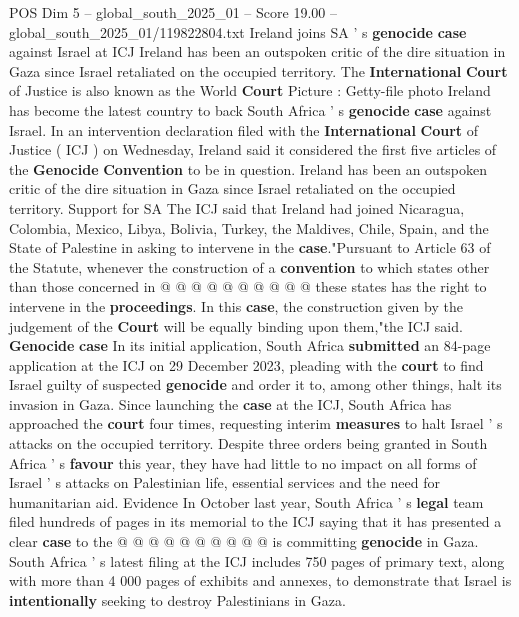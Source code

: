 \begin{textsample}{POS Dim 5 – global\_south\_2025\_01 – Score 19.00 – global\_south\_2025\_01/119822804.txt}  \label{ex:f5_pos_351}
Ireland joins SA ' s \textbf{genocide} \textbf{case} against Israel at ICJ Ireland has been an outspoken critic of the dire situation in Gaza since Israel retaliated on the occupied territory.
The \textbf{International} \textbf{Court} of Justice is also known as the World \textbf{Court} Picture : Getty-file photo Ireland has become the latest country to back South Africa ' s \textbf{genocide} \textbf{case} against Israel.
In an intervention declaration filed with the \textbf{International} \textbf{Court} of Justice ( ICJ ) on Wednesday, Ireland said it considered the first five articles of the \textbf{Genocide} \textbf{Convention} to be in question.
Ireland has been an outspoken critic of the dire situation in Gaza since Israel retaliated on the occupied territory.
Support for SA The ICJ said that Ireland had joined Nicaragua, Colombia, Mexico, Libya, Bolivia, Turkey, the Maldives, Chile, Spain, and the State of Palestine in asking to intervene in the \textbf{case}."Pursuant to Article 63 of the Statute, whenever the construction of a \textbf{convention} to which states other than those concerned in @ @ @ @ @ @ @ @ @ @ these states has the right to intervene in the \textbf{proceedings}.
In this \textbf{case}, the construction given by the judgement of the \textbf{Court} will be equally binding upon them,"the ICJ said. \textbf{Genocide} \textbf{case} In its initial application, South Africa \textbf{submitted} an 84-page application at the ICJ on 29 December 2023, pleading with the \textbf{court} to find Israel guilty of suspected \textbf{genocide} and order it to, among other things, halt its invasion in Gaza.
Since launching the \textbf{case} at the ICJ, South Africa has approached the \textbf{court} four times, requesting interim \textbf{measures} to halt Israel ' s attacks on the occupied territory.
Despite three orders being granted in South Africa ' s \textbf{favour} this year, they have had little to no impact on all forms of Israel ' s attacks on Palestinian life, essential services and the need for humanitarian aid.
Evidence In October last year, South Africa ' s \textbf{legal} team filed hundreds of pages in its memorial to the ICJ saying that it has presented a clear \textbf{case} to the @ @ @ @ @ @ @ @ @ @ is committing \textbf{genocide} in Gaza.
South Africa ' s latest filing at the ICJ includes 750 pages of primary text, along with more than 4 000 pages of exhibits and annexes, to demonstrate that Israel is \textbf{intentionally} seeking to destroy Palestinians in Gaza.

\end{textsample}
